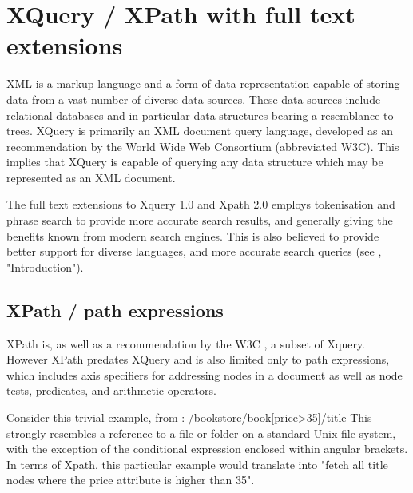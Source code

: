 \section{XQuery / XPath with full text extensions}
\label{sect:theory:xquery}
XML is a markup language and a form of data representation capable of storing
data from a vast number of diverse data sources. These data sources include
relational databases and in particular data structures bearing a resemblance to
trees. XQuery is primarily an XML document query language, developed as an
recommendation by the World Wide Web Consortium\cite{w3c00} (abbreviated W3C).
This implies that XQuery is capable of querying any data structure which may be
represented as an XML document.

The full text extensions to Xquery 1.0 and Xpath 2.0 employs tokenisation and
phrase search to provide more accurate search results, and generally giving the
benefits known from modern search engines. This is also believed to provide
better support for diverse languages, and more accurate search queries (see
\cite{w3c02}, "Introduction").

\subsection{XPath / path expressions}
XPath is, as well as a recommendation by the W3C \cite{w3c01}, a subset of
Xquery. However XPath predates XQuery and is also limited only to path
expressions, which includes axis specifiers for addressing nodes in a document
as well as node tests, predicates, and arithmetic operators.

Consider this trivial example, from \cite{w3s00}:
/bookstore/book[price>35]/title
This strongly resembles a reference to a file or folder on a standard Unix file
system, with the exception of the conditional expression enclosed within
angular brackets. In terms of Xpath, this particular example would translate
into "fetch all title nodes where the price attribute is higher than 35".       

